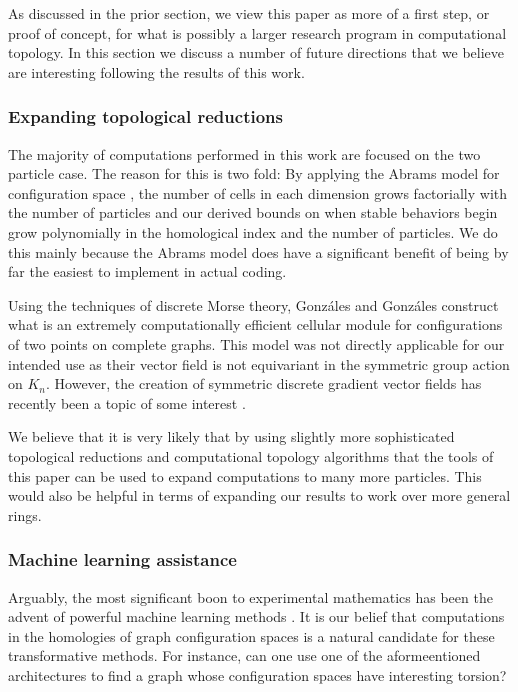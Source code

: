 \documentclass[12pt]{amsart}
\theoremstyle{definition}
\begin{document}
As discussed in the prior section, we view this paper as more of a first step, or proof of concept, for what is possibly a larger research program in computational topology. In this section we discuss a number of future directions that we believe are interesting following the results of this work.

\subsubsection{Expanding topological reductions}

The majority of computations performed in this work are focused on the two particle case. The reason for this is two fold: By applying the Abrams model for configuration space \cite{Abr}, the number of cells in each dimension grows factorially with the number of particles and our derived bounds on when stable behaviors begin grow polynomially in the homological index and the number of particles. We do this mainly because the Abrams model does have a significant benefit of being by far the easiest to implement in actual coding.

Using the techniques of discrete Morse theory, Gonz\'ales and Gonz\'ales \cite{GG} construct what is an extremely computationally efficient cellular module for configurations of two points on complete graphs. This model was not directly applicable for our intended use as their vector field is not equivariant in the symmetric group action on $K_n$. However, the creation of symmetric discrete gradient vector fields has recently been a topic of some interest \cite{Y}.

We believe that it is very likely that by using slightly more sophisticated topological reductions and computational topology algorithms that the tools of this paper can be used to expand computations to many more particles. This would also be helpful in terms of expanding our results to work over more general rings.

\subsubsection{Machine learning assistance}

Arguably, the most significant boon to experimental mathematics has been the advent of powerful machine learning methods \cite{AIDiscover,funsearch,funsearch2,CEWW}. It is our belief that computations in the homologies of graph configuration spaces is a natural candidate for these transformative methods. For instance, can one use one of the aformeentioned architectures to find a graph whose configuration spaces have interesting torsion?
\end{document}
